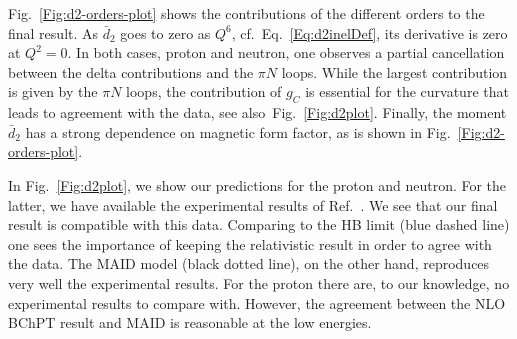 \documentclass[twocolumn,prc,showpacs,nofootinbib,preprintnumbers,amsmath,amssymb,superscriptaddress]{revtex4-1}
\begin{document}

Fig.~\ref{Fig:d2-orders-plot} shows the contributions of the different orders to the final result. As $\bar{d}_2$ goes to zero as $Q^6$, cf.\ Eq.~\eqref{Eq:d2inelDef}, its derivative is zero at $Q^2=0$. In both cases, proton and neutron, one observes a partial cancellation between the delta contributions and the $\pi N$ loops.
While the largest contribution is given by the $\pi N$ loops, the contribution of $g_C$ is essential for the curvature that leads to agreement with the data, see also\ Fig.~\ref{Fig:d2plot}. Finally, the moment $\bar{d}_2$ has a strong dependence on magnetic form factor, as is shown in Fig.~\ref{Fig:d2-orders-plot}. 

In Fig.~\ref{Fig:d2plot}, we show our predictions for the proton and neutron. 
For the latter, we have available the experimental results of Ref.~\cite{Amarian:2003jy}.
We see that our final result is compatible with this data. 
Comparing to the HB limit \cite{Kao:2002cp,Kao:2003jd} (blue dashed line) one sees the importance of keeping the relativistic result in order to agree with the data.
The MAID model \cite{MAID} (black dotted line), on the other hand, reproduces very well the experimental results.
For the proton there are, to our knowledge, no experimental results to compare with. However, the agreement between the NLO BChPT result and MAID is reasonable at the low energies.
\end{document}
